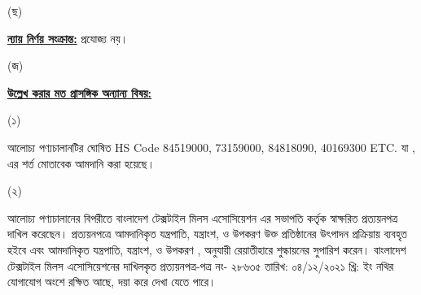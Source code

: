 \documentclass[12pt]{article}
\newcommand{\hscode}{84519000, 73159000, 84818090, 40169300 ETC.}
\newcommand{\btmaltno}{পত্র নং- ২৮৬৩৫}
\newcommand{\btmaltnodt}{তারিখ:  ০৪/১২/২০২১ খ্রি:}
\begin{document}
\begin{minipage}[t]{0.05\linewidth}
(ছ)
\end{minipage}
\begin{minipage}[t]{0.90\linewidth}
\underline{\textbf{ন্যায় নির্ণয় সংক্রান্ত:}} প্রযোজ্য নয়।
\\
\end{minipage}
\begin{minipage}[t]{0.05\linewidth}
\hspace{1em}
\end{minipage}
\begin{minipage}[t]{0.05\linewidth}
(জ)
\end{minipage}
\begin{minipage}[t]{0.05\linewidth}
\end{minipage}
\begin{minipage}[t]{0.90\linewidth}
\underline{\textbf{উল্লেখ করার মত প্রাসঙ্গিক অন্যান্য বিষয়:}}
\end{minipage}
\footnotesize
\begin{minipage}[t]{0.05\linewidth}
\hspace{1em}
\end{minipage}
\begin{minipage}[t]{0.05\linewidth}
\hspace{1em}
\end{minipage}
\begin{minipage}[t]{0.05\linewidth}
(১)
\end{minipage}
\begin{minipage}[t]{0.85\linewidth}
আলোচ্য পণ্যচালানটির ঘোষিত HS Code {\hscode}
যা {\srooot}, {\sroootd} এর শর্ত মোতাবেক
আমদানি করা হয়েছে।
\end{minipage}
\begin{minipage}[t]{0.05\linewidth}
\hspace{1em}
\end{minipage}
\begin{minipage}[t]{0.05\linewidth}
\hspace{1em}
\end{minipage}
\begin{minipage}[t]{0.05\linewidth}
(২)
\end{minipage}
\begin{minipage}[t]{0.85\linewidth}
আলোচ্য পণ্যচালানের বিপরীতে বাংলাদেশ
টেক্সটাইল মিলস এসোসিয়েশন এর সভাপতি
কর্তৃক স্বাক্ষরিত প্রত্যয়নপত্র
দাখিল করেছেন। প্রত্যয়নপত্রে আমদানিকৃত
যন্ত্রপাতি, যন্ত্রাংশ, ও উপকরণ
উক্ত প্রতিষ্ঠানের উৎপাদন প্রক্রিয়ায়
ব্যবহৃত হইবে এবং আমদানিকৃত
যন্ত্রপাতি, যন্ত্রাংশ, ও উপকরণ
{\srooot}, {\sroootd} অনুযায়ী
রেয়াতীহারে শুল্কায়নের সুপারিশ
করেন। বাংলাদেশ টেক্সটাইল মিলস
এসোসিয়েশনের দাখিলকৃত প্রত্যয়নপত্র-{\btmaltno}
{\btmaltnodt} ইং নথির যোগাযোগ অংশে রক্ষিত
আছে, দয়া করে দেখা যেতে পারে।
\end{minipage}
\end{document}
